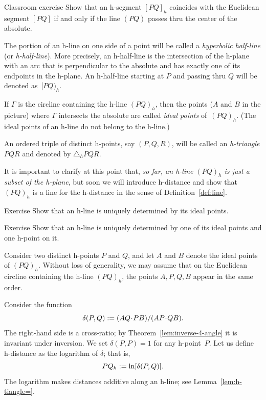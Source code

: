 \begin{thm}[!]{Classroom exercise}\label{ex:line/h-line}
Show that an h-segment $[PQ]_h$ coincides with the Euclidean segment $[PQ]$
if and only if the line $(PQ)$ passes thru the center of the absolute.
\end{thm}

The portion of an h-line on one side of a point will be called a {}\emph{hyperbolic half-line} (or \emph{h-half-line}).
More precisely, an h-half-line is the intersection of the h-plane with an arc that is perpendicular to the absolute and has exactly one of its endpoints in the h-plane.
An h-half-line starting at $P$ and passing thru $Q$ will be denoted as~$[PQ)_h$.

If $\Gamma$ is the circline containing the h-line $(PQ)_h$, then the points ($A$ and $B$ in the picture) where $\Gamma$ intersects the absolute are called
\emph{ideal points} of~$(PQ)_h$.
(The ideal points of an h-line do not belong to the h-line.)

An ordered triple of distinct h-points, say $(P,Q,R)$, will be called an {}\emph{h-triangle $PQR$} and denoted by $\triangle_h P Q R$.

It is important to clarify at this point that, \textit{so far, an h-line $(PQ)_h$ is just a subset of the h-plane},
but soon we will introduce h-distance 
and show that $(PQ)_h$ is a line for the h-distance in the sense of Definition~\ref{def:line}.

\begin{thm}[!]{Exercise}\label{ex:ideal-line-unique}
Show that an h-line is uniquely determined by its ideal points.
\end{thm}

\begin{thm}{Exercise}\label{ex:1ideal-line-unique}
Show that an h-line is uniquely determined by one of its ideal points and one h-point on it.
\end{thm}

\label{h-dist}
Consider two distinct h-points $P$ and $Q$,
and let $A$ and $B$ denote the ideal points of $(PQ)_h$.
Without loss of generality, we may assume that on the Euclidean circline containing the h-line $(PQ)_h$, the points $A,P,Q,B$ appear in the same order.

Consider the function 
$$\delta(P,Q)\df\frac{AQ\cdot PB}{AP\cdot QB}.$$
The right-hand side is a cross-ratio;
by Theorem~\ref{lem:inverse-4-angle} it is invariant under inversion.
We set $\delta(P,P)=1$ for any h-point~$P$.
Let us define h-distance as the logarithm of $\delta$; that is,
$$PQ_h:=\ln[\delta(P,Q)].$$
The logarithm makes distances additive along an h-line;
see Lemma~\ref{lem:h-tiangle=}.

